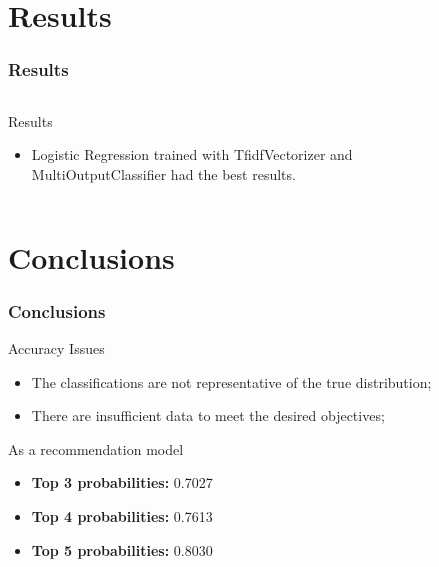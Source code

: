 \section{Results}  %
\begin{frame}
	\frametitle{Results}
	\begin{columns}
	
	\begin{column}{0.5\textwidth}

		\begin{block}{Results} 
			\begin{itemize}
				\item Logistic Regression trained with TfidfVectorizer and MultiOutputClassifier had the best results.
			\end{itemize}
		\end{block}
	
 	\end{column}
			
	\begin{column}{0.5\textwidth}
		\begin{table}
		\centering
			\resizebox{0.6\textwidth}{!}{
				
			}
			\caption{Results}
		\end{table}
	\end{column}

\end{columns}
\end{frame}
\section{Conclusions}  %
\begin{frame}
	\frametitle{Conclusions}

	\begin{alertblock}{Accuracy Issues}
	\begin{itemize}
		\item The classifications are not representative of the true distribution;
		\item There are insufficient data to meet the desired objectives;
	\end{itemize}
	\end{alertblock}

	\begin{exampleblock}{As a recommendation model}
		\begin{itemize}
			\item \textbf{Top 3 probabilities:} 0.7027
			\item \textbf{Top 4 probabilities:} 0.7613
			\item \textbf{Top 5 probabilities:} 0.8030
		\end{itemize}
	\end{exampleblock}

\end{frame}
